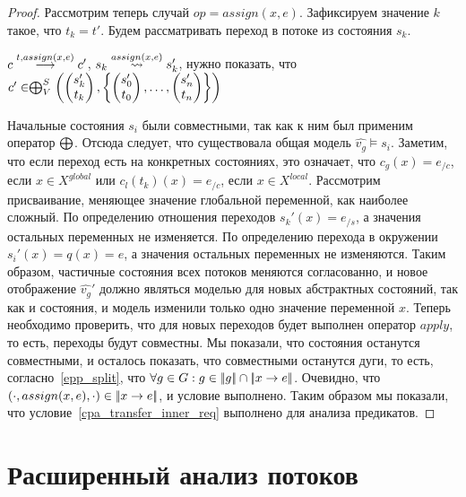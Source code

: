 \begin{proof}
Рассмотрим теперь случай $op = assign(x, e)$. Зафиксируем значение $k$ такое, что $t_k = t'$. Будем рассматривать переход в потоке из состояния $s_k$.

$c \stackrel{t, assign(x, e)}{\longrightarrow} c'$, $s_k \stackrel{assign(x, e)}{\leadsto} s_k'$, нужно показать, что 
$c' \in \mathrel{\bigoplus}^S_V
\left(
\begin{pmatrix}
s_k' \\
t_k 
\end{pmatrix},
\left\{
\begin{pmatrix}
s_0' \\
t_0 
\end{pmatrix},
\dots ,
\begin{pmatrix}
s_n' \\
t_n 
\end{pmatrix}
\right\}
\right)$

Начальные состояния $s_i$ были совместными, так как к ним был применим оператор $\mathrel{\bigoplus}$. 
Отсюда следует, что существовала общая модель $\hat{v_g} \models s_i$.
Заметим, что если переход есть на конкретных состояниях, это означает, что $c_g(x) = e_{/c}$, если $x \in X^{global}$ или $c_l(t_k)(x) = e_{/c}$, если $x \in X^{local}$.
Рассмотрим присваивание, меняющее значение глобальной переменной, как наиболее сложный.
По определению отношения переходов $s_k'(x) = e_{/s}$, а значения остальных переменных не изменяется.
По определению перехода в окружении $s_i'(x) = q(x) = e$, а значения остальных переменных не изменяются.
Таким образом, частичные состояния всех потоков меняются согласованно, и новое отображение $\hat{v_g}'$ должно являться моделью для новых абстрактных состояний, так как и состояния, и модель изменили только одно значение переменной $x$.
Теперь необходимо проверить, что для новых переходов будет выполнен оператор $apply$, то есть, переходы будут совместны.
Мы показали, что состояния останутся совместными, и осталось показать, что совместными останутся дуги, то есть, согласно~\ref{epp_split}, что $\forall g \in G: g \in \lvert \! \lvert g \rvert \! \rvert \cap \lvert \! \lvert x \to e \rvert \! \rvert$. 
Очевидно, что $(\cdot, assign(x, e), \cdot) \in \lvert \! \lvert x \to e \rvert \! \rvert$, и условие выполнено.
Таким образом мы показали, что условие~\ref{cpa_transfer_inner_req} выполнено для анализа предикатов.

\end{proof}

\section{Расширенный анализ потоков}
\label{sect_extended_thread_analysis}

